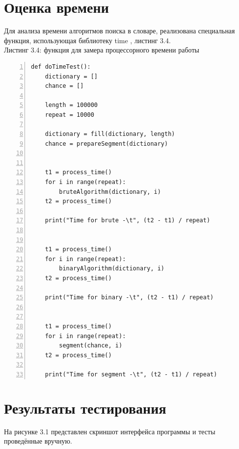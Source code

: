 \documentclass[12pt,a4paper]{report}
\begin{document}
\section{Оценка времени}

Для анализа времени алгоритмов поиска в словаре, реализована специальная функция, использующая 
библиотеку time \cite{time_bib}, листинг 3.4. \\

\textrm{Листинг 3.4: функция для замера процессорного времени работы}
\begin{lstlisting}[frame=single, numbers=left]
def doTimeTest():
    dictionary = []
    chance = []
 
    length = 100000
    repeat = 10000

    dictionary = fill(dictionary, length)
    chance = prepareSegment(dictionary)


    t1 = process_time()
    for i in range(repeat):
        bruteAlgorithm(dictionary, i)
    t2 = process_time()

    print("Time for brute -\t", (t2 - t1) / repeat)


    t1 = process_time()
    for i in range(repeat):
        binaryAlgorithm(dictionary, i)
    t2 = process_time()

    print("Time for binary -\t", (t2 - t1) / repeat)


    t1 = process_time()
    for i in range(repeat):
        segment(chance, i)
    t2 = process_time()

    print("Time for segment -\t", (t2 - t1) / repeat)
\end{lstlisting}

\newpage
\section{Результаты тестирования}

На рисунке 3.1 представлен скриншот интерфейса программы и тесты проведённые вручную.
\end{document}

